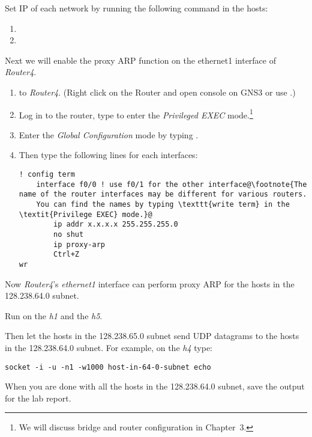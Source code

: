 \documentclass{../UTNetLab}
\begin{document}
Set IP of each network by running the following command in the hosts:
\begin{enumerate}
    \item {}
    \item {}
\end{enumerate}
Next we will enable the proxy ARP function on the ethernet1 interface of \textit{Router4}.
\begin{enumerate}
    \item {} to \textit{Router4}.
          (Right click on the Router and open console on GNS3 or use .)
    \item Log in to the router, type  to enter the \textit{Privileged EXEC} mode.\footnote{We will discuss bridge and router configuration in Chapter~3.}
    \item Enter the \textit{Global Configuration} mode by typing .
    \item Then type the following lines for each interfaces:
          \begin{lstlisting}[language={cisco}, escapechar={@}, emph={x}]
! config term
    interface f0/0 ! use f0/1 for the other interface@\footnote{The name of the router interfaces may be different for various routers.
    You can find the names by typing \texttt{write term} in the \textit{Privilege EXEC} mode.}@
        ip addr x.x.x.x 255.255.255.0
        no shut
        ip proxy-arp
        Ctrl+Z
wr
        \end{lstlisting}
\end{enumerate}

Now \textit{Router4}’s \textit{ethernet1} interface can perform proxy ARP for the hosts in the 128.238.64.0 subnet.

Run  on the \textit{h1} and the \textit{h5}.

Then let the hosts in the 128.238.65.0 subnet send UDP datagrams to the hosts in the 128.238.64.0 subnet.
For example, on the \textit{h4} type:
\begin{lstlisting}[emph={host-in-64-0-subnet},morekeywords={[3]echo}]
socket -i -u -n1 -w1000 host-in-64-0-subnet echo
    \end{lstlisting}

When you are done with all the hosts in the 128.238.64.0 subnet, save the  output for the lab report.
\end{document}
